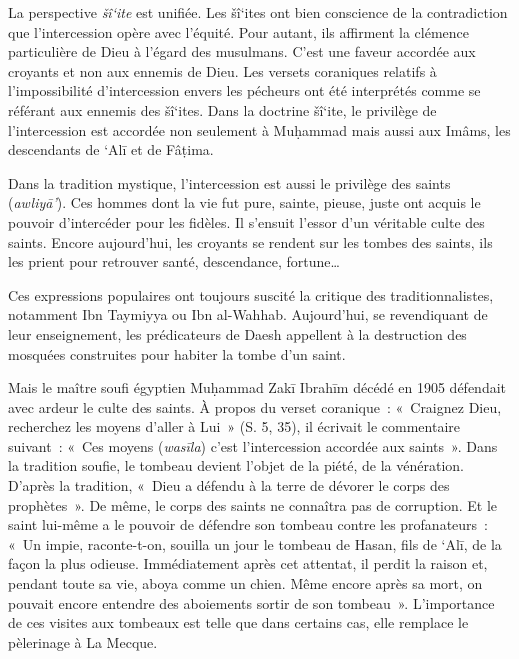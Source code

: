 La perspective \emph{šî`ite} est unifiée. Les šî`ites ont bien
conscience de la contradiction que l'intercession opère avec l'équité.
Pour autant, ils affirment la clémence particulière de Dieu à l'égard
des musulmans. C'est une faveur accordée aux croyants et non aux ennemis
de Dieu. Les versets coraniques relatifs à l'impossibilité
d'intercession envers les pécheurs ont été interprétés comme se référant
aux ennemis des šî`ites. Dans la doctrine šî`ite, le privilège de
l'intercession est accordée non seulement à Muḥammad mais aussi aux
Imâms, les descendants de `Alī et de Fâṭima.

Dans la tradition mystique, l'intercession est aussi le privilège des
saints (\emph{awliyā'}). Ces hommes dont la vie fut pure, sainte,
pieuse, juste ont acquis le pouvoir d'intercéder pour les fidèles. Il
s'ensuit l'essor d'un véritable culte des saints. Encore aujourd'hui,
les croyants se rendent sur les tombes des saints, ils les prient pour
retrouver santé, descendance, fortune\ldots{}


Ces expressions populaires ont toujours suscité la critique des
traditionnalistes, notamment Ibn Taymiyya ou Ibn al-Wahhab. Aujourd'hui,
se revendiquant de leur enseignement, les prédicateurs de Daesh
appellent à la destruction des mosquées construites pour habiter la
tombe d'un saint.


Mais le maître soufi égyptien Muḥammad Zakī Ibrahīm décédé en 1905
défendait avec ardeur le culte des saints. À propos du verset
coranique~: «~Craignez Dieu, recherchez les moyens d'aller à Lui~» (S.
5, 35), il écrivait le commentaire suivant~: «~Ces moyens
(\emph{wasīla}) c'est l'intercession accordée aux saints~». Dans la
tradition soufie, le tombeau devient l'objet de la piété, de la
vénération. D'après la tradition, «~Dieu a défendu à la terre de dévorer
le corps des prophètes~». De même, le corps des saints ne connaîtra pas
de corruption. Et le saint lui-même a le pouvoir de défendre son tombeau
contre les profanateurs~: «~Un impie, raconte-t-on, souilla un jour le
tombeau de Hasan, fils de `Alī, de la façon la plus odieuse.
Immédiatement après cet attentat, il perdit la raison et, pendant toute
sa vie, aboya comme un chien. Même encore après sa mort, on pouvait
encore entendre des aboiements sortir de son tombeau~». L'importance de ces visites aux tombeaux est
telle que dans certains cas, elle remplace le pèlerinage à La Mecque.

